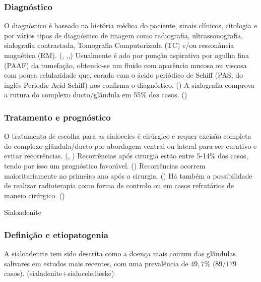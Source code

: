 \subsubsection{Diagnóstico}

O diagnóstico é baseado na história médica do paciente, sinais clínicos, citologia e por vários tipos de diagnóstico de imagem como radiografia, ultrassonografia, sialografia contrastada, Tomografia Computorizada (TC) e/ou ressonância magnética (RM). (\cite{Bae2024}, \cite{sa_},\cite{Olimpo2023},\cite{deLaPuerta2020}) Usualmente é \cite{Kumar2017}ado por punção aspirativa por agulha fina (PAAF) da tumefação, obtendo-se um fluido com aparência mucosa ou viscosa com pouca celularidade que, corada com o ácido periódico de Schiff (PAS, do inglês Periodic Acid-Schiff) nos confirma o diagnóstico. (\cite{Poirier2018}) A sialografia comprova  a rutura do complexo ducto/glândula em 55\% dos casos. (\cite{Olimpo2023}) 

\subsubsection{Tratamento e prognóstico}

O tratamento de escolha para as sialoceles é cirúrgico e requer excisão completa do complexo glândula/ducto por abordagem ventral ou lateral para ser curativo e evitar recorrências. (\cite{Poirier2018}, \cite{Swieton2022}) Recorrências após cirurgia estão entre 5-14\% dos casos, tendo por isso um prognóstico favorável. (\cite{Poirier2018}) Recorrências ocorrem maioritariamente no primeiro ano após a cirurgia. (\cite{Swieton2022}) Há também a possibilidade de realizar radioterapia como forma de controlo ou em casos refratários de maneio cirúrgico. (\cite{Poirier2018})

Sialoadenite
\subsubsection{Definição e etiopatogenia}
A sialoadenite tem sido descrita como a doença mais comum das glândulas salivares em estudos mais recentes, com uma prevalência de $49,7\%$  ($89/179$ casos). (sialadenite+sialocele;lieske)

